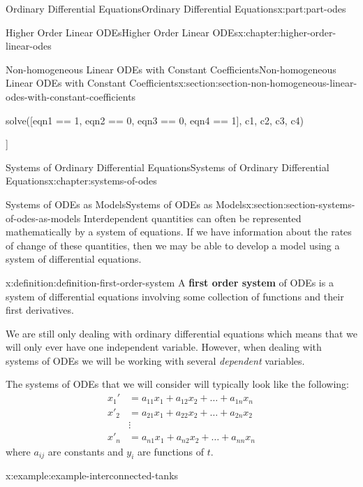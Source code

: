 \documentclass[twoside,10pt,]{book}
\newcommand{\terminology}[1]{\textbf{#1}}
\numberwithin{equation}{part}
\newcommand{\amp}{&}
\begin{document}
\begin{partptx}{Ordinary Differential Equations}{}{Ordinary Differential Equations}{}{}{x:part:part-odes}
\begin{chapterptx}{Higher Order Linear ODEs}{}{Higher Order Linear ODEs}{}{}{x:chapter:higher-order-linear-odes}
\begin{sectionptx}{Non-homogeneous Linear ODEs with Constant Coefficients}{}{Non-homogeneous Linear ODEs with Constant Coefficients}{}{}{x:section:section-non-homogeneous-linear-odes-with-constant-coefficients}
\begin{sageinput}
solve([eqn1 == 1, eqn2 == 0, eqn3 == 0, eqn4 == 1], c1, c2, c3, c4)
\end{sageinput}
\begin{sageoutput}
[[c1 == (1/6), c2 == (2/9), c3 == (-41/3530), c4 == (-43/3530)]]
\end{sageoutput}
\end{sectionptx}
\end{chapterptx}
%
\typeout{************************************************}
\typeout{************************************************}
%
\begin{chapterptx}{Systems of Ordinary Differential Equations}{}{Systems of Ordinary Differential Equations}{}{}{x:chapter:systems-of-odes}
%
%
\typeout{************************************************}
\typeout{************************************************}
%
\begin{sectionptx}{Systems of ODEs as Models}{}{Systems of ODEs as Models}{}{}{x:section:section-systems-of-odes-as-models}
Interdependent quantities can often be represented mathematically by a system of equations. If we have information about the rates of change of these quantities, then we may be able to develop a model using a system of differential equations.%
\begin{definition}{}{x:definition:definition-first-order-system}%
%
A \terminology{first order system} of ODEs is a system of differential equations involving some collection of functions and their first derivatives.%
\end{definition}
We are still only dealing with ordinary differential equations which means that we will only ever have one independent variable. However, when dealing with systems of ODEs we will be working with several \emph{dependent} variables.%
\par
The systems of ODEs that we will consider will typically look like the following:%
\begin{align*}
x_{1}'  \amp=  a_{11}x_{1} +a_{12}x_{2}+\dots+a_{1n}x_{n}\\
x'_{2}  \amp=  a_{21}x_{1} + a_{22}x_{2} + \dots + a_{2n}x_{2}\\
\amp\vdots\\
x'_{n}  \amp=  a_{n1}x_{1} + a_{n2}x_{2} + \dots + a_{nn}x_{n}
\end{align*}
where \(a_{ij}\) are constants and \(y_{i}\) are functions of \(t\).%
\begin{example}{}{x:example:example-interconnected-tanks}%

\end{example}
\end{sectionptx}
\end{chapterptx}
\end{partptx}
\end{document}
